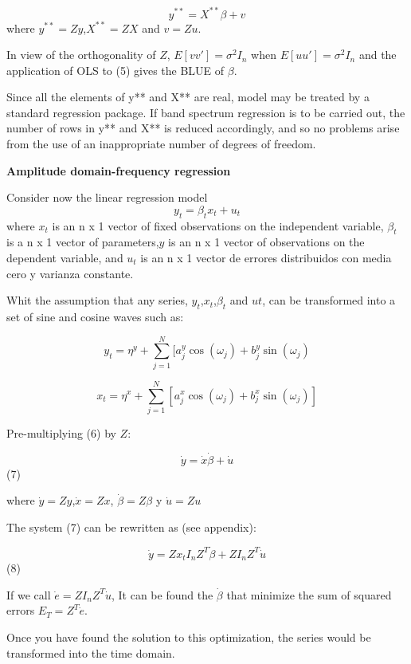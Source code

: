 \documentclass{article}\usepackage[]{graphicx}\usepackage[]{color}
\begin{document}
\begin{equation}
    y^{**}=X^{**}\beta+v
\end{equation}
where $y^{**}=Zy$,$X^{**}=ZX$ and $v=Zu$.

In view of the orthogonality of $Z$,  $E[vv']=\sigma^2 I_n$ when  $E[uu']=\sigma^2 I_n$ and the application of OLS to (5) gives the BLUE of $\beta$.

Since all the elements of y** and X** are real, model may be treated by a standard regression package. If band spectrum regression is to be carried out, the number of rows in y** and X** is reduced accordingly, and so no problems arise from the use of an inappropriate number of degrees of freedom.



{\bf Amplitude domain-frequency regression}


Consider now the linear regression model
\begin{equation}
    y_t=\beta_tx_t+u_t
    \end{equation}
where $x_t$  is an n x 1 vector of fixed observations on the independent variable, $ \beta_t $ is a n x 1 vector of parameters,$y$ is an n x 1 vector of observations on the dependent
variable, and  $u_t$  is an n x 1 vector de errores distribuidos con media cero y varianza constante.

Whit the assumption that any series, $y_t$,$x_t$,$\beta_t$ and $ut$, can be transformed into a set of sine and cosine waves such as:



$$y_t=\eta^y+\sum_{j=1}^N[a^y_j\cos(\omega_j)+b^y_j\sin(\omega_j)$$

$$x_t=\eta^x+\sum_{j=1}^N[a^x_j\cos(\omega_j)+b^x_j\sin(\omega_j)]$$





 Pre-multiplying (6) by  $Z$:


 $$ \dot y=\dot x\dot\beta+\dot u $$ (7)
    
where $\dot y = Zy$,$ \dot x = Zx$, $ \dot \beta = Z\beta$ y  $ \dot u = Zu$

The system (7) can be rewritten as (see appendix):


$$ \dot y=Zx_tI_nZ^T\dot \beta + ZI_nZ^T\dot u$$ (8)


If we call $ \dot e = ZI_nZ ^ T \dot u $, It can be found  the $ \dot \beta $ that minimize the sum of squared errors $ E_T = Z ^ T \dot e $.


Once you have found the solution to this optimization, the series would be transformed into the time domain.
\end{document}
